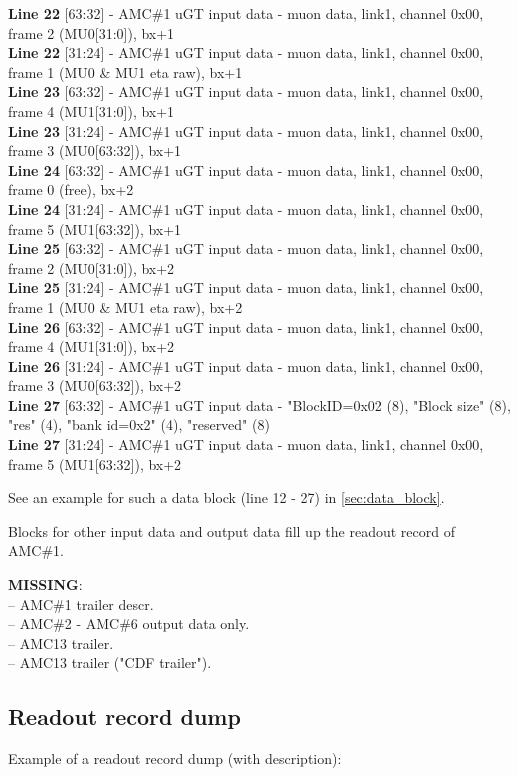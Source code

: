 \textbf{Line 22} [63:32] - AMC\#1 uGT input data - muon data, link1, channel 0x00, frame 2 (MU0[31:0]), bx+1\\
\textbf{Line 22} [31:24] - AMC\#1 uGT input data - muon data, link1, channel 0x00, frame 1 (MU0 \& MU1 eta raw), bx+1\\
\textbf{Line 23} [63:32] - AMC\#1 uGT input data - muon data, link1, channel 0x00, frame 4 (MU1[31:0]), bx+1\\
\textbf{Line 23} [31:24] - AMC\#1 uGT input data - muon data, link1, channel 0x00, frame 3 (MU0[63:32]), bx+1\\
\textbf{Line 24} [63:32] - AMC\#1 uGT input data - muon data, link1, channel 0x00, frame 0 (free), bx+2\\
\textbf{Line 24} [31:24] - AMC\#1 uGT input data - muon data, link1, channel 0x00, frame 5 (MU1[63:32]), bx+1\\
\textbf{Line 25} [63:32] - AMC\#1 uGT input data - muon data, link1, channel 0x00, frame 2 (MU0[31:0]), bx+2\\
\textbf{Line 25} [31:24] - AMC\#1 uGT input data - muon data, link1, channel 0x00, frame 1 (MU0 \& MU1 eta raw), bx+2\\
\textbf{Line 26} [63:32] - AMC\#1 uGT input data - muon data, link1, channel 0x00, frame 4 (MU1[31:0]), bx+2\\
\textbf{Line 26} [31:24] - AMC\#1 uGT input data - muon data, link1, channel 0x00, frame 3 (MU0[63:32]), bx+2\\
\textbf{Line 27} [63:32] - AMC\#1 uGT input data - "BlockID=0x02 (8), "Block size" (8), "res" (4), "bank id=0x2" (4), "reserved" (8)\\
\textbf{Line 27} [31:24] - AMC\#1 uGT input data - muon data, link1, channel 0x00, frame 5 (MU1[63:32]), bx+2

See an example for such a data block (line 12 - 27) in \ref{sec:data_block}.

Blocks for other input data and output data fill up the readout record of AMC\#1.

\textbf{MISSING}:\\
-- AMC\#1 trailer descr.\\
-- AMC\#2 - AMC\#6 output data only.\\
-- AMC13 trailer.\\
-- AMC13 trailer ("CDF trailer").

\clearpage

\subsection{Readout record dump}
\label{sec:ror_dump}
Example of a readout record dump (with description):

